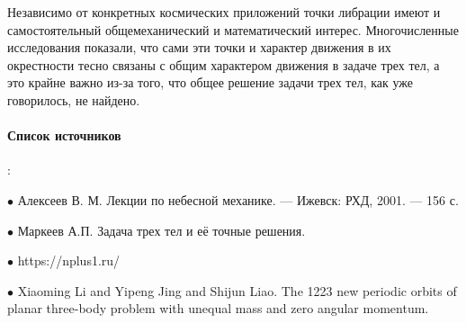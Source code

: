 \documentclass[a4paper, 12pt]{article}%
\begin{document}
Независимо от конкретных космических приложений точки либрации имеют и самостоятельный общемеханический и математический интерес. Многочисленные исследования
показали, что сами эти точки и характер движения в их окрестности тесно связаны с общим
характером движения в задаче трех тел, а это крайне важно из-за того, что общее решение задачи трех тел, как уже говорилось, не найдено. 


\paragraph{Список источников}:


$\bullet$  Алексеев В. М. Лекции по небесной механике. — Ижевск: РХД, 2001. — 156 с.

$\bullet$  Маркеев А.П. Задача трех тел и её точные решения.

$\bullet$  https://nplus1.ru/

$\bullet$  Xiaoming Li and Yipeng Jing and Shijun Liao. The 1223 new periodic orbits of planar three-body problem
with unequal mass and zero angular momentum.
\end{document}
